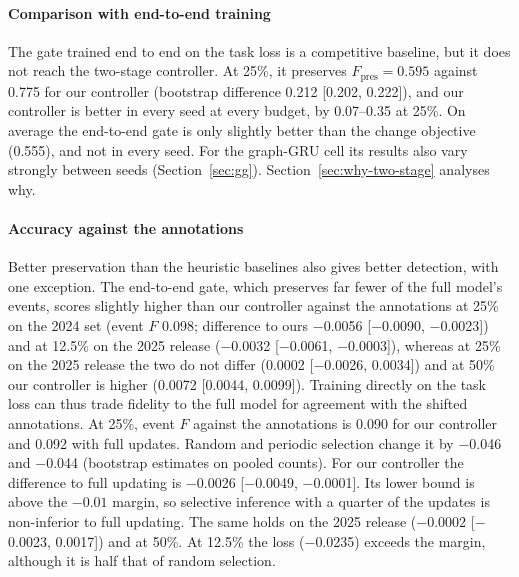 \paragraph*{Comparison with end-to-end training} The gate trained end to end on the task loss is a competitive baseline, but it does not reach the two-stage controller. At 25\%, it preserves $F_{\mathrm{pres}}=0.595$ against 0.775 for our controller (bootstrap difference 0.212 [0.202, 0.222]), and our controller is better in every seed at every budget, by 0.07--0.35 at 25\%. On average the end-to-end gate is only slightly better than the change objective (0.555), and not in every seed. For the graph-GRU cell its results also vary strongly between seeds (Section~\ref{sec:gg}). Section~\ref{sec:why-two-stage} analyses why.

\paragraph*{Accuracy against the annotations}
Better preservation than the heuristic baselines also gives better detection, with one exception. The end-to-end gate, which preserves far fewer of the full model's events, scores slightly higher than our controller against the annotations at 25\% on the 2024 set (event $F$ 0.098; difference to ours \ensuremath{-}0.0056 [\ensuremath{-}0.0090, \ensuremath{-}0.0023]) and at 12.5\% on the 2025 release (\ensuremath{-}0.0032 [\ensuremath{-}0.0061, \ensuremath{-}0.0003]), whereas at 25\% on the 2025 release the two do not differ (0.0002 [\ensuremath{-}0.0026, 0.0034]) and at 50\% our controller is higher (0.0072 [0.0044, 0.0099]). Training directly on the task loss can thus trade fidelity to the full model for agreement with the shifted annotations. At 25\%, event $F$ against the annotations is 0.090 for our controller and 0.092 with full updates. Random and periodic selection change it by \ensuremath{-}0.046 and \ensuremath{-}0.044 (bootstrap estimates on pooled counts). For our controller the difference to full updating is \ensuremath{-}0.0026 [\ensuremath{-}0.0049, \ensuremath{-}0.0001]. Its lower bound is above the $-0.01$ margin, so selective inference with a quarter of the updates is non-inferior to full updating. The same holds on the 2025 release (\ensuremath{-}0.0002 [\ensuremath{-}0.0023, 0.0017]) and at 50\%. At 12.5\% the loss (\ensuremath{-}0.0235) exceeds the margin, although it is half that of random selection.

